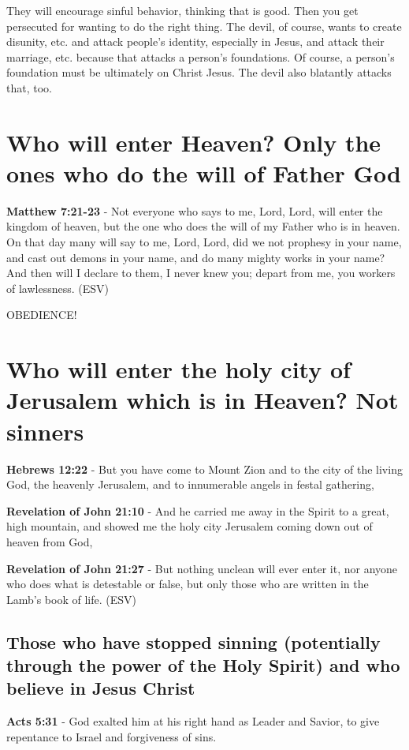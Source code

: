 \documentclass[11pt]{article}
\begin{document}
They will encourage sinful behavior, thinking that is good.
Then you get persecuted for wanting to do the right thing.
The devil, of course, wants to create disunity, etc. and attack people's identity, especially in Jesus, and attack their marriage, etc.
because that attacks a person's foundations.
Of course, a person's foundation must be ultimately on Christ Jesus.
The devil also blatantly attacks that, too.

\section{Who will enter Heaven? Only the ones who do the will of Father God}
\label{sec:org1c60a33}
\textbf{Matthew 7:21-23} -  Not everyone who says to me, Lord, Lord, will enter the kingdom of heaven, but the one who does the will of my Father who is in heaven.  On that day many will say to me, Lord, Lord, did we not prophesy in your name, and cast out demons in your name, and do many mighty works in your name?  And then will I declare to them, I never knew you; depart from me, you workers of lawlessness.  (ESV)

OBEDIENCE!

\section{Who will enter the holy city of Jerusalem which is in Heaven? Not sinners}
\label{sec:org94bf6a3}
\textbf{Hebrews 12:22} - But you have come to Mount Zion and to the city of the living God, the heavenly Jerusalem, and to innumerable angels in festal gathering,

\textbf{Revelation of John 21:10} - And he carried me away in the Spirit to a great, high mountain, and showed me the holy city Jerusalem coming down out of heaven from God,

\textbf{Revelation of John 21:27} -  But nothing unclean will ever enter it, nor anyone who does what is detestable or false, but only those who are written in the Lamb's book of life.  (ESV)

\subsection{Those who have stopped sinning (potentially through the power of the Holy Spirit) and who believe in Jesus Christ}
\label{sec:orgbdd317c}
\textbf{Acts 5:31} - God exalted him at his right hand as Leader and Savior, to give repentance to Israel and forgiveness of sins.
\end{document}
